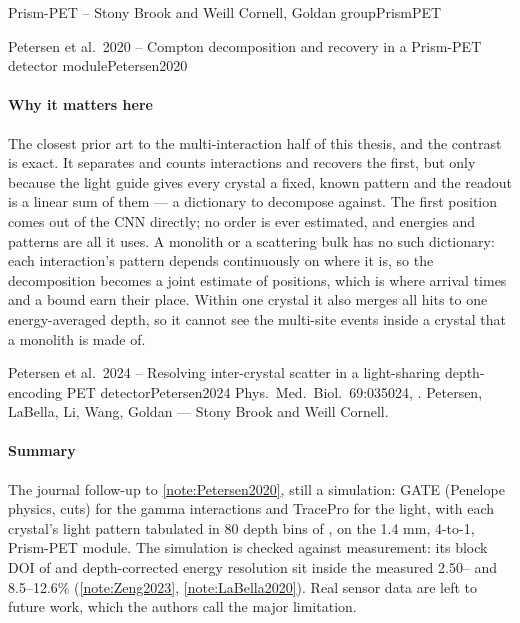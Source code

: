 \begin{programnote}{Prism-PET -- Stony Brook and Weill Cornell, Goldan group}{PrismPET}
\begin{papernote}{Petersen et al.\ 2020 -- Compton decomposition and recovery in a Prism-PET detector module}{Petersen2020}
\paragraph{Why it matters here}
The closest prior art to the multi-interaction half of this thesis, and the
contrast is exact. It separates and counts interactions and recovers the first,
but only because the light guide gives every crystal a fixed, known pattern and
the readout is a linear sum of them --- a dictionary to decompose against. The
first position comes out of the CNN directly; no order is ever estimated, and
energies and patterns are all it uses. A monolith or a scattering bulk has no
such dictionary: each interaction's pattern depends continuously on where it
is, so the decomposition becomes a joint estimate of positions, which is where
arrival times and a bound earn their place. Within one crystal it also merges
all hits to one energy-averaged depth, so it cannot see the multi-site events
inside a crystal that a monolith is made of.

\end{papernote}

\begin{papernote}{Petersen et al.\ 2024 -- Resolving inter-crystal scatter in a light-sharing depth-encoding PET detector}{Petersen2024}
Phys.\ Med.\ Biol.\ 69:035024, . Petersen,
LaBella, Li, Wang, Goldan --- Stony Brook and Weill Cornell.

\paragraph{Summary}
The journal follow-up to \ref{note:Petersen2020}, still a simulation: GATE
(Penelope physics,  cuts) for the gamma interactions and TracePro for
the light, with each crystal's light pattern tabulated in 80 depth bins of
, on the 1.4 mm, 4-to-1,  Prism-PET module. The simulation is
checked against measurement: its block DOI of  and depth-corrected
energy resolution sit inside the measured 2.50-- and 8.5--12.6\%
(\ref{note:Zeng2023}, \ref{note:LaBella2020}). Real sensor data are left to
future work, which the authors call the major limitation.


\end{papernote}
\end{programnote}
